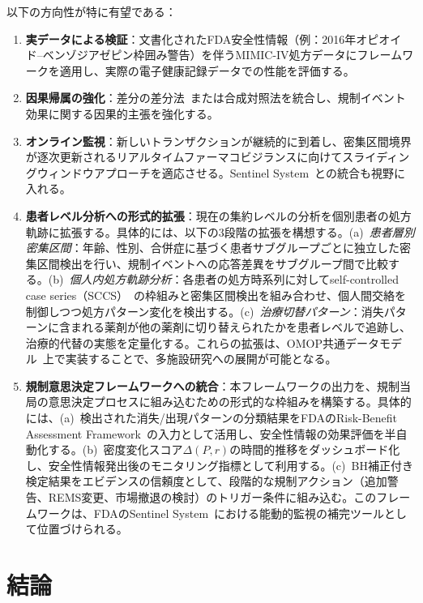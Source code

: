 \documentclass[11pt]{article}
\begin{document}
以下の方向性が特に有望である：
\begin{enumerate}
\item \textbf{実データによる検証}：文書化されたFDA安全性情報（例：2016年オピオイド--ベンゾジアゼピン枠囲み警告）を伴うMIMIC-IV処方データにフレームワークを適用し、実際の電子健康記録データでの性能を評価する。
\item \textbf{因果帰属の強化}：差分の差分法~\citep{dimick2014did}または合成対照法を統合し、規制イベント効果に関する因果的主張を強化する。
\item \textbf{オンライン監視}：新しいトランザクションが継続的に到着し、密集区間境界が逐次更新されるリアルタイムファーマコビジランスに向けてスライディングウィンドウアプローチを適応させる。Sentinel System~\citep{platt2012sentinel}との統合も視野に入れる。
\item \textbf{患者レベル分析への形式的拡張}：現在の集約レベルの分析を個別患者の処方軌跡に拡張する。具体的には、以下の3段階の拡張を構想する。(a)~\emph{患者層別密集区間}：年齢、性別、合併症に基づく患者サブグループごとに独立した密集区間検出を行い、規制イベントへの応答差異をサブグループ間で比較する。(b)~\emph{個人内処方軌跡分析}：各患者の処方時系列に対してself-controlled case series（SCCS）~\citep{whitaker2006sccs}の枠組みと密集区間検出を組み合わせ、個人間交絡を制御しつつ処方パターン変化を検出する。(c)~\emph{治療切替パターン}：消失パターンに含まれる薬剤が他の薬剤に切り替えられたかを患者レベルで追跡し、治療的代替の実態を定量化する。これらの拡張は、OMOP共通データモデル~\citep{hripcsak2015omop}上で実装することで、多施設研究への展開が可能となる。
    \item \textbf{規制意思決定フレームワークへの統合}：本フレームワークの出力を、規制当局の意思決定プロセスに組み込むための形式的な枠組みを構築する。具体的には、(a)~検出された消失/出現パターンの分類結果をFDAのRisk-Benefit Assessment Framework~\citep{mt2013fda}の入力として活用し、安全性情報の効果評価を半自動化する。(b)~密度変化スコア$\Delta(P, r)$の時間的推移をダッシュボード化し、安全性情報発出後のモニタリング指標として利用する。(c)~BH補正付き検定結果をエビデンスの信頼度として、段階的な規制アクション（追加警告、REMS変更、市場撤退の検討）のトリガー条件に組み込む。このフレームワークは、FDAのSentinel System~\citep{platt2012sentinel}における能動的監視の補完ツールとして位置づけられる。
\end{enumerate}

\section{結論}\label{sec:conclusion}
\end{document}
